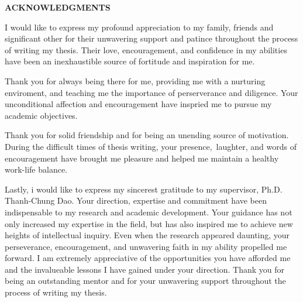 \documentclass[../Main.tex]{subfiles}
\begin{document}
\begin{center}
    \Large{\textbf{ACKNOWLEDGMENTS}}\\
\end{center}
\vspace{1cm}

I would like to express my profound appreciation to my family, friends and significant other for their unwavering support and patince throughout the process of writing my thesis. Their love, encouragement, and confidence in my abilities have been an inexhaustible source of fortitude and inspiration for me.\

Thank you for always being there for me, providing me with a nurturing enviroment, and teaching me the importance of perserverance and diligence. Your unconditional affection and encouragement have inspried me to pursue my academic objectives. \

Thank you for solid friendship and for being an unending source of motivation. During the difficult times of thesis writing, your presence, laughter, and words of encouragement have brought me pleasure and helped me maintain a healthy work-life balance.\

Lastly, i would like to express my sincerest gratitude to my supervisor, Ph.D. Thanh-Chung Dao. Your direction, expertise and commitment have been indispensable to my research and academic development. Your guidance has not only increased my expertise in the field, but has also inspired me to achieve new heights of intellectual inquiry. Even when the research appeared daunting, your perseverance, encouragement, and unwavering faith in my ability propelled me forward. I am extremely appreciative of the opportunities you have afforded me and the invalueable lessons I have gained under your direction. Thank you for being an outstanding mentor and for your unwavering support throughout the process of writing my thesis.
\end{document}
